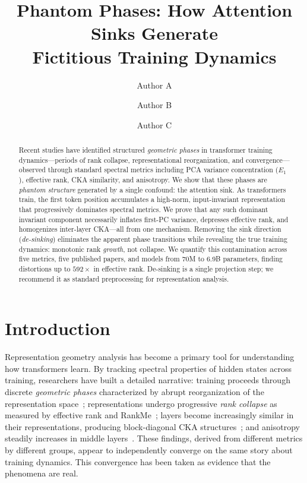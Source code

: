 \documentclass[11pt]{article}
\title{Phantom Phases: How Attention Sinks Generate\\Fictitious Training Dynamics}
\author[1]{Author A}
\author[1]{Author B}
\author[1]{Author C}
\affil[1]{Anonymous Institution}
\date{}
\begin{document}
\maketitle

\begin{abstract}
Recent studies have identified structured \emph{geometric phases} in transformer training dynamics---periods of rank collapse, representational reorganization, and convergence---observed through standard spectral metrics including PCA variance concentration ($E_1$), effective rank, CKA similarity, and anisotropy. We show that these phases are \emph{phantom structure} generated by a single confound: the attention sink. As transformers train, the first token position accumulates a high-norm, input-invariant representation that progressively dominates spectral metrics. We prove that any such dominant invariant component necessarily inflates first-PC variance, depresses effective rank, and homogenizes inter-layer CKA---all from one mechanism. Removing the sink direction (\emph{de-sinking}) eliminates the apparent phase transitions while revealing the true training dynamics: monotonic rank \emph{growth}, not collapse. We quantify this contamination across five metrics, five published papers, and models from 70M to 6.9B parameters, finding distortions up to $592\times$ in effective rank. De-sinking is a single projection step; we recommend it as standard preprocessing for representation analysis.
\end{abstract}

\section{Introduction}\label{sec:intro}

Representation geometry analysis has become a primary tool for understanding how transformers learn. By tracking spectral properties of hidden states across training, researchers have built a detailed narrative: training proceeds through discrete \emph{geometric phases} characterized by abrupt reorganization of the representation space~\citep{li2024geometric}; representations undergo progressive \emph{rank collapse} as measured by effective rank and RankMe~\citep{garrido2023rankme,noci2022signal}; layers become increasingly similar in their representations, producing block-diagonal CKA structures~\citep{raghu2021vision}; and anisotropy steadily increases in middle layers~\citep{ethayarajh2019contextual}. These findings, derived from different metrics by different groups, appear to independently converge on the same story about training dynamics. This convergence has been taken as evidence that the phenomena are real.
\end{document}
